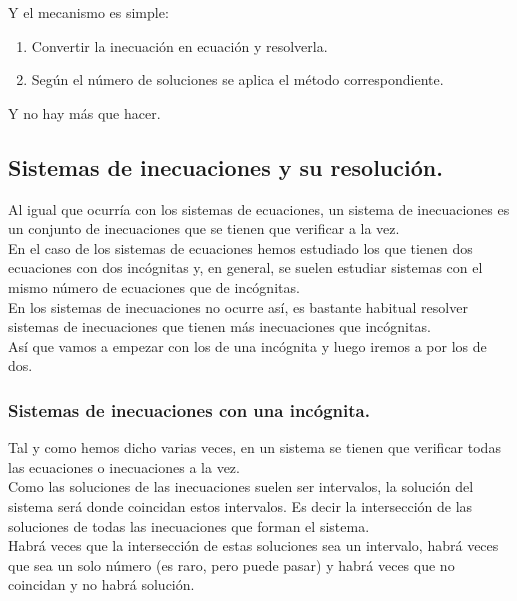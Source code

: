 \documentclass[a4paper,11pt,answers]{exam}
\begin{document}
Y el mecanismo es simple:
\begin{enumerate}
\item Convertir la inecuación en ecuación y resolverla.
\item Según el número de soluciones se aplica el método correspondiente.
\end{enumerate}

Y no hay más que hacer.

\subsection{Sistemas de inecuaciones y su resolución.}
Al igual que ocurría con los sistemas de ecuaciones, un sistema de inecuaciones es un conjunto
de inecuaciones que se tienen que verificar a la vez.\\

En el caso de los sistemas de ecuaciones hemos estudiado los que tienen dos ecuaciones con dos
incógnitas y, en general, se suelen estudiar sistemas con el mismo número de ecuaciones que de
incógnitas.\\

En los sistemas de inecuaciones no ocurre así, es bastante habitual resolver sistemas de
inecuaciones que tienen más inecuaciones que incógnitas.\\
Así que vamos a empezar con los de una incógnita y luego iremos a por los de dos.
\subsubsection{Sistemas de inecuaciones con una incógnita.}
Tal y como hemos dicho varias veces, en un sistema se tienen que verificar todas las ecuaciones o
inecuaciones a la vez.\\

Como las soluciones de las inecuaciones suelen ser intervalos, la solución del sistema será donde
coincidan estos intervalos. Es decir la intersección de las soluciones de todas las inecuaciones
que forman el sistema.\\
Habrá veces que la intersección de estas soluciones sea un intervalo, habrá veces que sea un
solo número (es raro, pero puede pasar) y habrá veces que no coincidan y no habrá solución.\\
\end{document}
